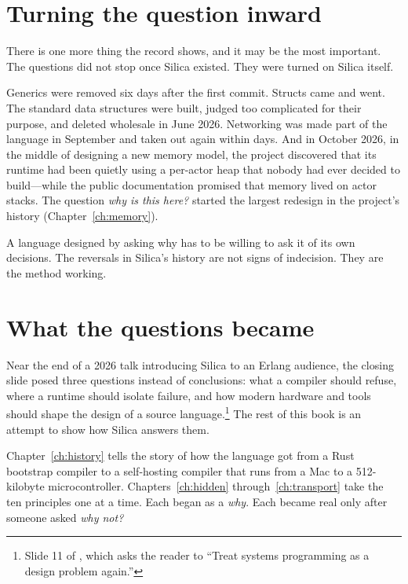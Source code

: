\section{Turning the question inward}

There is one more thing the record shows, and it may be the most important.
The questions did not stop once Silica existed. They were turned on Silica
itself.

Generics were removed six days after the first commit. Structs came and went.
The standard data structures were built, judged too complicated for their
purpose, and deleted wholesale in June 2026. Networking was made part of the
language in September and taken out again within days. And in October 2026, in
the middle of designing a new memory model, the project discovered that its
runtime had been quietly using a per-actor heap that nobody had ever
decided to build---while the public documentation promised that memory lived on
actor stacks. The question \emph{why is this here?} started the largest
redesign in the project's history (Chapter~\ref{ch:memory}).

A language designed by asking why has to be willing to ask it of its own
decisions. The reversals in Silica's history are not signs of indecision. They
are the method working.

\section{What the questions became}

Near the end of a 2026 talk introducing Silica to an Erlang audience, the
closing slide posed three questions instead of conclusions: what a compiler
should refuse, where a runtime should isolate failure, and how modern hardware
and tools should shape the design of a source language.\footnote{Slide 11 of
, which asks the reader to
``Treat systems programming as a design problem again.''} The rest of this book
is an attempt to show how Silica answers them.

Chapter~\ref{ch:history} tells the story of how the language got from a Rust
bootstrap compiler to a self-hosting compiler that runs from a Mac to a
512-kilobyte microcontroller. Chapters~\ref{ch:hidden} through~\ref{ch:transport}
take the ten principles one at a time. Each began as a \emph{why}. Each became
real only after someone asked \emph{why not?}

